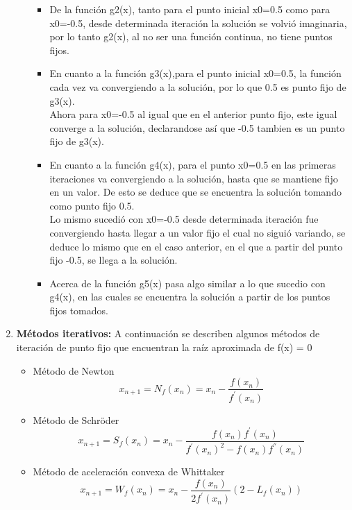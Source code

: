\documentclass{udpreport}
\begin{document}
\begin{enumerate}
\begin{enumerate}
\begin{itemize}
\item De la función g2(x), tanto para el punto inicial x0=0.5 como para x0=-0.5, desde determinada iteración la solución se volvió imaginaria, por lo tanto g2(x), al no ser una función continua, no tiene puntos fijos.
\item En cuanto a la función g3(x),para el punto inicial x0=0.5, la función cada vez va convergiendo a la solución, por lo que 0.5 es punto fijo de g3(x).\\ Ahora para x0=-0.5 al igual que en el anterior punto fijo, este igual converge a la solución, declarandose así que -0.5 tambien es un punto fijo de g3(x).
\item En cuanto a la función g4(x), para el punto x0=0.5 en las primeras iteraciones va convergiendo a la solución, hasta que se mantiene fijo en un valor. De esto se deduce que se encuentra la solución tomando como punto fijo 0.5.\\
Lo mismo sucedió con x0=-0.5 desde determinada iteración fue convergiendo hasta llegar a un valor fijo el cual no siguió variando, se deduce lo mismo que en el caso anterior, en el que a partir del punto fijo -0.5, se llega a la solución.
\item Acerca de la función g5(x) pasa algo similar a lo que sucedio con g4(x), en las cuales se encuentra la solución a partir de los puntos fijos tomados.
\end{itemize}

\end{enumerate}

\item {\bf Métodos iterativos:} A continuación se describen algunos métodos de iteración de punto fijo que encuentran la raíz aproximada de f(x) = 0
\begin{itemize}
        \item Método de Newton     
            \begin{equation*}
                 x_{n+1}=N_f(x_n)=x_n -  \frac{f(x_n)}{f^{'}(x_n)}
            \end{equation*}
        
        \item Método de Schröder
            \begin{equation*}
                x_{n+1}=S_f(x_n)=x_n-\frac{f(x_n)f^{'}(x_n)}{f^{'}(x_n)^{2}-f(x_n)f^{''}(x_n)}
            \end{equation*}
        
        \item Método de aceleración convexa de Whittaker
            \begin{equation*}
                x_{n+1}=W_f(x_n)=x_n - \frac{f(x_n)}{2f^{'}(x_n)}(2 - L_f(x_n))
            \end{equation*}
        

\end{itemize}
\end{enumerate}
\end{document}
